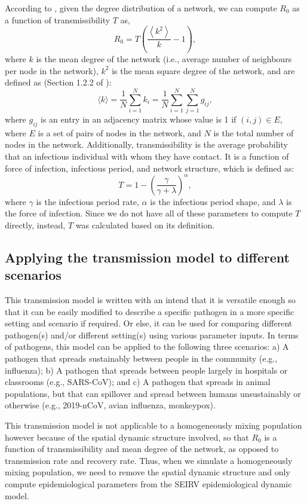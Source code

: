 \documentclass[a4paper]{article}
\begin{document}
	According to \cite{Meyers2005JTheoBiol}, given the degree distribution of a network, we can compute $R_0$ as a function of transmissibility $T$ as,
	\begin{equation}
	R_0 = T\left (\frac{\left \langle k^2 \right \rangle}{k}-1\right),
	\end{equation}
	where $k$ is the mean degree of the network (i.e., average number of neighbours per node in the network), $k^2$ is the mean square degree of the network, and are defined as (Section 1.2.2 of \cite{Kiss2017}):
	\begin{equation}\label{equ: degree}
	\langle k\rangle = \frac{1}{N}\sum_{i=1}^{N}k_i=\frac{1}{N}\sum_{i=1}^{N}\sum_{j=1}^{N}g_{ij},
	\end{equation}
	where $g_{ij}$ is an entry in an adjacency matrix whose value is 1 if $(i,j) \in E$, where $E$ is a set of pairs of nodes in the network, and $N$ is the total number of nodes in the network. Additionally, transmissibility is the average probability that an infectious individual with whom they have contact. It is a function of force of infection, infectious period, and network structure, which is defined as\cite{Kahn2018ClinTrials}:
	\begin{equation}\label{equ: transmissibility}
	T = 1-\left(\frac{\gamma}{\gamma+\lambda}\right)^\alpha,
	\end{equation}
	where $\gamma$ is the infectious period rate, $\alpha$ is the infectious period shape, and $\lambda$ is the force of infection. Since we do not have all of these parameters to compute $T$ directly, instead, $T$ was calculated based on its definition.
	
	\subsection{Applying the transmission model to different scenarios}
	\label{sec:Example}
	This transmission model is written with an intend that it is versatile enough so that it can be easily modified to describe a specific pathogen in a more specific setting and scenario if required. Or else, it can be used for comparing different pathogen(s) and/or different setting(s) using various parameter inputs. In terms of pathogens, this model can be applied to the following three scenarios: a) A pathogen that spreads sustainably between people in the community (e.g., influenza); b) A pathogen that spreads between people largely in hospitals or classrooms (e.g., SARS-CoV); and c) A pathogen that spreads in animal populations, but that can spillover and spread between humans unsustainably or otherwise (e.g., 2019-nCoV, avian influenza, monkeypox). 
	
	This transmission model is not applicable to a homogeneously mixing population however because of the spatial dynamic structure involved, so that $R_0$ is a function of transmissibility and mean degree of the network, as opposed to transmission rate and recovery rate. Thus, when we simulate a homogeneously mixing population, we need to remove the spatial dynamic structure and only compute epidemiological parameters from the SEIRV epidemiological dynamic model.
	
	\label{Bibliography}
	
	
	
\end{document}
